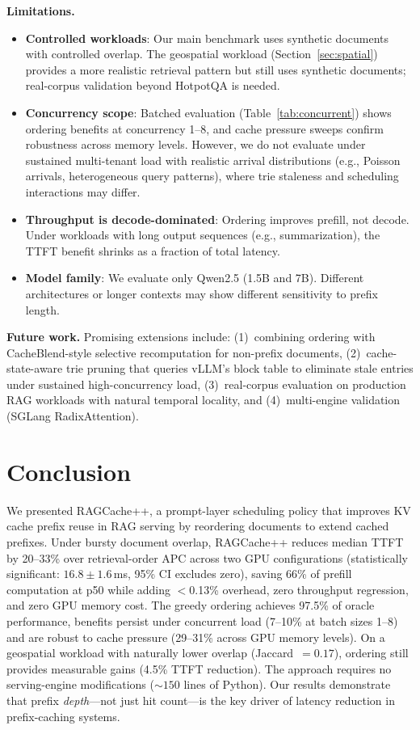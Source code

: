 \documentclass{article}
\begin{document}
\textbf{Limitations.}
\begin{itemize}
\item \textbf{Controlled workloads}: Our main benchmark uses synthetic documents with controlled overlap. The geospatial workload (Section~\ref{sec:spatial}) provides a more realistic retrieval pattern but still uses synthetic documents; real-corpus validation beyond HotpotQA is needed.
\item \textbf{Concurrency scope}: Batched evaluation (Table~\ref{tab:concurrent}) shows ordering benefits at concurrency 1--8, and cache pressure sweeps confirm robustness across memory levels. However, we do not evaluate under sustained multi-tenant load with realistic arrival distributions (e.g., Poisson arrivals, heterogeneous query patterns), where trie staleness and scheduling interactions may differ.
\item \textbf{Throughput is decode-dominated}: Ordering improves prefill, not decode. Under workloads with long output sequences (e.g., summarization), the TTFT benefit shrinks as a fraction of total latency.
\item \textbf{Model family}: We evaluate only Qwen2.5 (1.5B and 7B). Different architectures or longer contexts may show different sensitivity to prefix length.
\end{itemize}

\textbf{Future work.} Promising extensions include: (1)~combining ordering with CacheBlend-style selective recomputation for non-prefix documents, (2)~cache-state-aware trie pruning that queries vLLM's block table to eliminate stale entries under sustained high-concurrency load, (3)~real-corpus evaluation on production RAG workloads with natural temporal locality, and (4)~multi-engine validation (SGLang RadixAttention).

\section{Conclusion}
\label{sec:conclusion}

We presented RAGCache++, a prompt-layer scheduling policy that improves KV cache prefix reuse in RAG serving by reordering documents to extend cached prefixes. Under bursty document overlap, RAGCache++ reduces median TTFT by 20--33\% over retrieval-order APC across two GPU configurations (statistically significant: $16.8 \pm 1.6$\,ms, 95\% CI excludes zero), saving 66\% of prefill computation at p50 while adding $<$0.13\% overhead, zero throughput regression, and zero GPU memory cost. The greedy ordering achieves 97.5\% of oracle performance, benefits persist under concurrent load (7--10\% at batch sizes 1--8) and are robust to cache pressure (29--31\% across GPU memory levels). On a geospatial workload with naturally lower overlap (Jaccard~$= 0.17$), ordering still provides measurable gains (4.5\% TTFT reduction). The approach requires no serving-engine modifications (${\sim}150$ lines of Python). Our results demonstrate that prefix \emph{depth}---not just hit count---is the key driver of latency reduction in prefix-caching systems.
\end{document}
